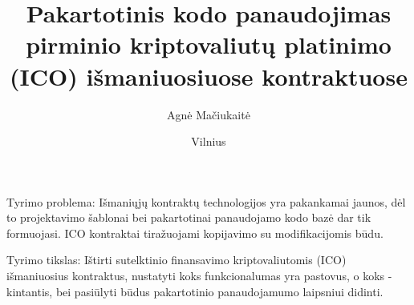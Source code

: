 \documentclass{VUMIFInfKursinis}
\title{Pakartotinis kodo panaudojimas pirminio kriptovaliutų platinimo (ICO) išmaniuosiuose kontraktuose}
\author{Agnė Mačiukaitė}
\date{Vilnius \\ \the\year}
\begin{document}
\maketitle

\tableofcontents

%
Tyrimo problema: Išmaniųjų kontraktų technologijos yra pakankamai jaunos, dėl to projektavimo šablonai bei pakartotinai panaudojamo kodo bazė dar tik formuojasi. ICO kontraktai tiražuojami kopijavimo su modifikacijomis būdu.

Tyrimo tikslas: Ištirti sutelktinio finansavimo kriptovaliutomis (ICO) išmaniuosius kontraktus, nustatyti koks funkcionalumas yra pastovus, o koks - kintantis, bei pasiūlyti būdus pakartotinio panaudojamumo laipsniui didinti.
%
%
%
\end{document}
